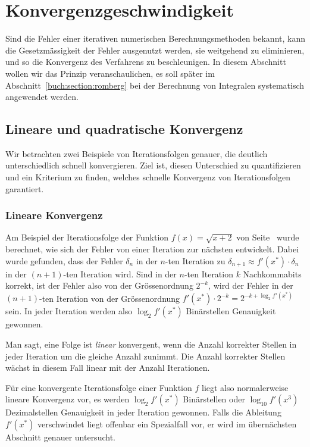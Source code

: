 %
%
%
\section{Konvergenzgeschwindigkeit
\label{buch:section:geschwindigkeit}}
Sind die Fehler einer iterativen numerischen Berechnungsmethoden
bekannt, kann die Gesetzmässigkeit der Fehler ausgenutzt werden,
sie weitgehend zu eliminieren, und so die Konvergenz des Verfahrens
zu beschleunigen.
In diesem Abschnitt wollen wir das Prinzip veranschaulichen, es
soll später im Abschnitt~\ref{buch:section:romberg}
bei der Berechnung von Integralen systematisch angewendet werden.

%
%
\subsection{Lineare und quadratische Konvergenz
\label{buch:subsection:linearekonvergenz}}
Wir betrachten zwei Beispiele von Iterationsfolgen genauer, die
deutlich unterschiedlich schnell konvergieren.
Ziel ist, diesen Unterschied zu quantifizieren und ein Kriterium
zu finden, welches schnelle Konvergenz von Iterationsfolgen garantiert.

\subsubsection{Lineare Konvergenz}
Am Beispiel der Iterationsfolge der Funktion $f(x)=\sqrt{x+2}$
von Seite~\pageref{section:beispiel:sqrtiteration}
wurde berechnet, wie sich der Fehler von einer Iteration zur nächsten
entwickelt.
Dabei wurde gefunden, dass der Fehler $\delta_n$ in der $n$-ten Iteration
zu $\delta_{n+1}\approx f'(x^*)\cdot\delta_n$ in der $(n+1)$-ten Iteration
wird.
Sind in der $n$-ten Iteration $k$ Nachkommabits korrekt, ist der Fehler
also von der Grössenordnung $2^{-k}$, wird der Fehler in der $(n+1)$-ten
Iteration von der Grössenordnung $f'(x^*) \cdot 2^{-k}= 2^{-k+\log_2f'(x^*)}$
sein.
In jeder Iteration werden also $\log_2f'(x^*)$ Binärstellen Genauigkeit
gewonnen.

Man sagt, eine Folge ist {\em linear} konvergent, wenn die Anzahl
korrekter Stellen in jeder Iteration um die gleiche Anzahl zunimmt.
Die Anzahl korrekter Stellen wächst in diesem Fall linear mit der
Anzahl Iterationen.

Für eine konvergente Iterationsfolge einer Funktion $f$ liegt also
normalerweise lineare Konvergenz vor, es werden $\log_2 f'(x^*)$
Binärstellen oder $\log_{10}f'(x^3)$ Dezimalstellen Genauigkeit in
jeder Iteration gewonnen.
Falls die Ableitung $f'(x^*)$ verschwindet liegt offenbar ein
Spezialfall vor, er wird im übernächsten Abschnitt genauer untersucht.

